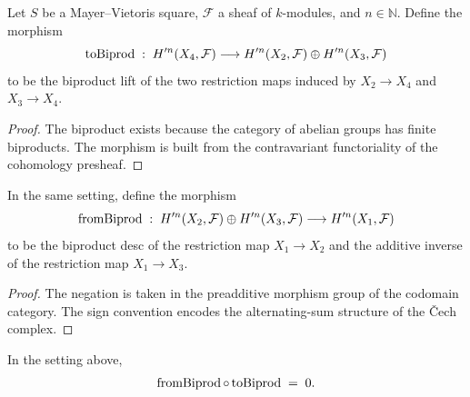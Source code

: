 \begin{definition}\leanok
  \label{def:Scheme_HModule_prime_toBiprod}

  Let \(S\) be a Mayer--Vietoris square, \(\mathcal F\) a sheaf of \(k\)-modules, and \(n \in \mathbb N\). Define the morphism
  \[
    \operatorname{toBiprod} \;:\; H^{\prime n}(X_4, \mathcal F) \longrightarrow H^{\prime n}(X_2, \mathcal F) \oplus H^{\prime n}(X_3, \mathcal F)
  \]
  to be the biproduct lift of the two restriction maps induced by \(X_2 \to X_4\) and \(X_3 \to X_4\).
\end{definition}

\begin{proof}
  
  \leanok
  The biproduct exists because the category of abelian groups has finite biproducts. The morphism is built from the contravariant functoriality of the cohomology presheaf.
\end{proof}

\begin{definition}\leanok
  \label{def:Scheme_HModule_prime_fromBiprod}

  In the same setting, define the morphism
  \[
    \operatorname{fromBiprod} \;:\; H^{\prime n}(X_2, \mathcal F) \oplus H^{\prime n}(X_3, \mathcal F) \longrightarrow H^{\prime n}(X_1, \mathcal F)
  \]
  to be the biproduct desc of the restriction map \(X_1 \to X_2\) and the additive inverse of the restriction map \(X_1 \to X_3\).
\end{definition}

\begin{proof}
  
  \leanok
  The negation is taken in the preadditive morphism group of the codomain category. The sign convention encodes the alternating-sum structure of the \v{C}ech complex.
\end{proof}

\begin{lemma}\leanok
  \label{lem:Scheme_HModule_prime_toBiprod_fromBiprod}

  In the setting above,
  \[
    \operatorname{fromBiprod} \circ \operatorname{toBiprod} \;=\; 0.
  \]
\end{lemma}

